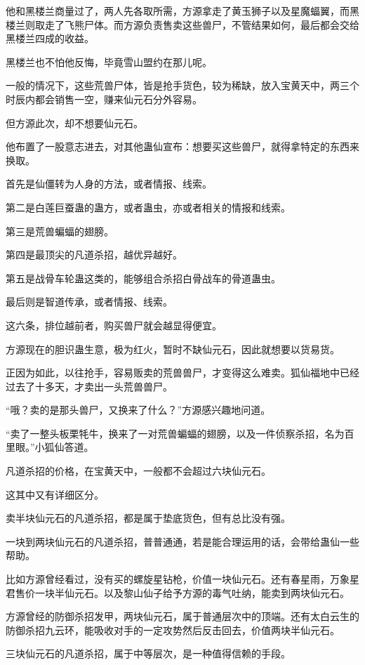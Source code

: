 \begin{this_body}
他和黑楼兰商量过了，两人先各取所需，方源拿走了黄玉狮子以及星魔蝠翼，而黑楼兰则取走了飞熊尸体。而方源负责售卖这些兽尸，不管结果如何，最后都会交给黑楼兰四成的收益。

黑楼兰也不怕他反悔，毕竟雪山盟约在那儿呢。

一般的情况下，这些荒兽尸体，皆是抢手货色，较为稀缺，放入宝黄天中，两三个时辰内都会销售一空，赚来仙元石分外容易。

但方源此次，却不想要仙元石。

他布置了一股意志进去，对其他蛊仙宣布：想要买这些兽尸，就得拿特定的东西来换取。

首先是仙僵转为人身的方法，或者情报、线索。

第二是白莲巨蚕蛊的蛊方，或者蛊虫，亦或者相关的情报和线索。

第三是荒兽蝙蝠的翅膀。

第四是最顶尖的凡道杀招，越优异越好。

第五是战骨车轮蛊这类的，能够组合杀招白骨战车的骨道蛊虫。

最后则是智道传承，或者情报、线索。

这六条，排位越前者，购买兽尸就会越显得便宜。

方源现在的胆识蛊生意，极为红火，暂时不缺仙元石，因此就想要以货易货。

正因为如此，以往抢手，容易贩卖的荒兽兽尸，才变得这么难卖。狐仙福地中已经过去了十多天，才卖出一头荒兽兽尸。

“哦？卖的是那头兽尸，又换来了什么？”方源感兴趣地问道。

“卖了一整头板栗牦牛，换来了一对荒兽蝙蝠的翅膀，以及一件侦察杀招，名为百里眼。”小狐仙答道。

凡道杀招的价格，在宝黄天中，一般都不会超过六块仙元石。

这其中又有详细区分。

卖半块仙元石的凡道杀招，都是属于垫底货色，但有总比没有强。

一块到两块仙元石的凡道杀招，普普通通，若是能合理运用的话，会带给蛊仙一些帮助。

比如方源曾经看过，没有买的螺旋星钻枪，价值一块仙元石。还有春星雨，万象星君售价一块半仙元石。以及黎山仙子给予方源的毒气吐纳，能卖到两块仙元石。

方源曾经的防御杀招发甲，两块仙元石，属于普通层次中的顶端。还有太白云生的防御杀招九云环，能吸收对手的一定攻势然后反击回去，价值两块半仙元石。

三块仙元石的凡道杀招，属于中等层次，是一种值得信赖的手段。


\end{this_body}
